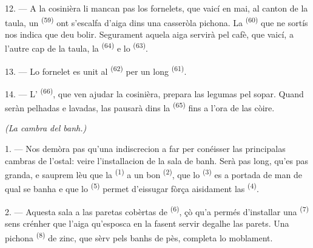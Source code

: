 12. --- A la cosinièra li mancan pas los fornelets, que vaicí en mai, al canton de
la taula, un  \textsuperscript{(59)} ont s'escalfa d'aiga
dins una casseròla pichona. La  \textsuperscript{(60)} que ne
sortís nos indica que deu bolir. Segurament aquela aiga servirà pel cafè, que
vaicí, a l'autre cap de la taula, la  \textsuperscript{(64)} e
lo  \textsuperscript{(63)}.

13. --- Lo fornelet es unit al  \textsuperscript{(62)} per un
long  \textsuperscript{(61)}.

14. --- L' \textsuperscript{(66)}, que ven ajudar la cosinièra,
prepara las legumas pel sopar. Quand seràn pelhadas e lavadas, las pausarà dins
la  \textsuperscript{(65)} fins a l'ora de las còire.

\VUsaut{4.0mm}
{\centering\fontsize{10.2pt}{10.2pt}\selectfont{} \textit{(La cambra del banh.)}\par}
\VUsaut{3.0mm}

1. --- Nos demòra pas qu'una indiscrecion a far per conéisser las principalas
cambras de l'ostal: veire l'installacion de la sala de banh. Serà pas long, qu'es
pas granda, e sauprem lèu que la  \textsuperscript{(1)} a un
bon  \textsuperscript{(2)}, que lo 
\textsuperscript{(3)} es a portada de man de qual se banha e que lo
 \textsuperscript{(5)} permet d'eissugar fòrça aisidament
las  \textsuperscript{(4)}.

2. --- Aquesta sala a las paretas cobèrtas de 
\textsuperscript{(6)}, çò qu'a permés d'installar una 
\textsuperscript{(7)} sens crénher que l'aiga qu'esposca en la fasent servir
degalhe las parets. Una pichona  \textsuperscript{(8)} de zinc, que
sèrv pels banhs de pès, completa lo moblament.
\VUsaut{6.0mm}
\VUfilet{22mm}
